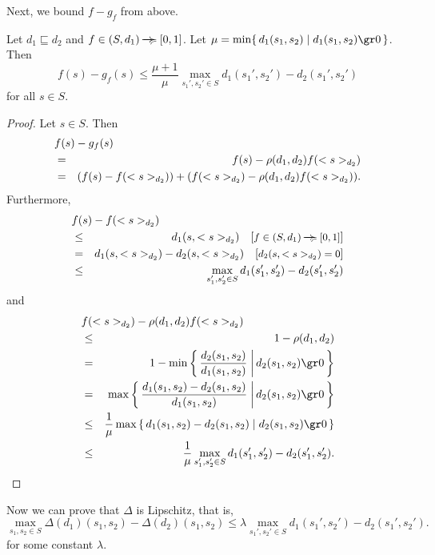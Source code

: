 \documentclass{LMCS}
\newcommand{\ndi}{\mathbin{\raisebox{0.15ex}{-\hspace{-0.2em}-\hspace{-0.2em}-\hspace{-0.2em}-\hspace{-0.2em}-\hspace{-0.2em}-}\hspace{-0.7em}\succcurlyeq}}
\newcommand{\comment}[1]{\hspace{1em}\mbox{[{\small #1}]}}
\newcommand{\bigmid}{\; \bigg| \,}
\begin{document}
Next, we bound $f - g_f$ from above.

\begin{prop}
\label{proposition:c}
Let $d_1 \sqsubseteq d_2$ and $f \in (S, d_1) \ndi [0, 1]$.
Let $\mu = \min \{\, d_1(s_1, s_2) \mid d_1(s_1, s_2) \gr 0 \,\}$.
Then
\begin{displaymath}
f(s) - g_f(s)
\leq
\frac{\mu + 1}{\mu} \max_{s_1', s_2' \in S} d_1(s_1', s_2') - d_2(s_1', s_2')
\end{displaymath}
for all $s \in S$.
\end{prop}
\begin{proof}
Let $s \in S$. Then
\begin{eqnarray*}
\lefteqn{f(s) - g_f(s)}\\
& = & f(s) - \rho(d_1, d_2) f(<s>_{d_2})\\
& = & (f(s) - f(<s>_{d_2})) + (f(<s>_{d_2}) - \rho(d_1, d_2) f(<s>_{d_2})).
\end{eqnarray*}
Furthermore,
\begin{eqnarray*}
\lefteqn{f(s) - f(<s>_{d_2})}\\
& \leq & d_1(s, <s>_{d_2})
\comment{$f \in (S, d_1) \ndi [0, 1]$}\\
& = & d_1(s, <s>_{d_2}) - d_2(s, <s>_{d_2})
\comment{$d_2(s, <s>_{d_2}) = 0$}\\
& \leq & \max_{s_1', s_2' \in S} d_1(s_1', s_2') - d_2(s_1', s_2')
\end{eqnarray*}
and
\begin{eqnarray*}
\lefteqn{f(<s>_{d_2}) - \rho(d_1, d_2) f(<s>_{d_2})}\\
& \leq & 1 - \rho(d_1, d_2)\\
& = & 1 - \min \left \{\, \frac{d_2(s_1, s_2)}{d_1(s_1, s_2)} \bigmid d_2(s_1, s_2) \gr 0  \, \right \}\\
& = & \max \left \{\, \frac{d_1(s_1, s_2) - d_2(s_1, s_2)}{d_1(s_1, s_2)} \bigmid d_2(s_1, s_2) \gr 0  \, \right \}\\
& \leq & \frac{1}{\mu} \max \left \{\, d_1(s_1, s_2) - d_2(s_1, s_2) \mid d_2(s_1, s_2) \gr 0  \, \right \}\\
& \leq & \frac{1}{\mu} \max_{s_1', s_2' \in S} d_1(s_1', s_2') - d_2(s_1', s_2').
\end{eqnarray*}
\end{proof}

Now we can prove that $\Delta$ is Lipschitz, that is,
\begin{displaymath}
\max_{s_1, s_2 \in S} \Delta(d_1)(s_1, s_2) - \Delta(d_2)(s_1, s_2) 
\leq
\lambda \max_{s_1', s_2' \in S} d_1(s_1', s_2') - d_2(s_1', s_2').
\end{displaymath}
for some constant $\lambda$.
\end{document}
